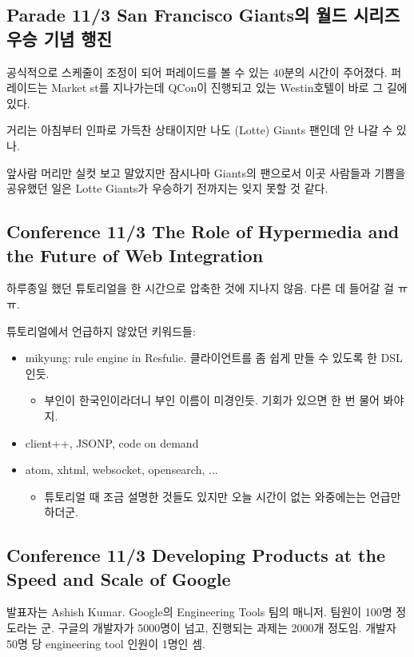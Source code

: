 \documentclass[a4paper]{article}
\begin{document}
\subsection{Parade 11/3 San Francisco Giants의 월드 시리즈 우승 기념 행진}
 
공식적으로 스케줄이 조정이 되어 퍼레이드를 볼 수 있는 40분의 시간이
주어졌다.  퍼레이드는 Market st를 지나가는데 QCon이 진행되고 있는
Westin호텔이 바로 그 길에 있다.
 
거리는 아침부터 인파로 가득찬 상태이지만 나도 (Lotte) Giants 팬인데 안
나갈 수 있나.
 
앞사람 머리만 실컷 보고 말았지만 잠시나마 Giants의 팬으로서 이곳
사람들과 기쁨을 공유했던 일은 Lotte Giants가 우승하기 전까지는 잊지
못할 것 같다.
 
\subsection{Conference 11/3 The Role of Hypermedia and the Future of
  Web Integration}
 
하루종일 했던 튜토리얼을 한 시간으로 압축한 것에 지나지 않음. 다른 데
들어갈 걸 ㅠㅠ.
 
튜토리얼에서 언급하지 않았던 키워드들:
\begin{itemize}
\item mikyung: rule engine in Resfulie. 클라이언트를 좀 쉽게 만들 수
  있도록 한 DSL인듯.
  \begin{itemize}
  \item 부인이 한국인이라더니 부인 이름이 미경인듯. 기회가 있으면 한 번
    물어 봐야지.
  \end{itemize}
\item client++, JSONP, code on demand
\item atom, xhtml, websocket, opensearch, ...
  \begin{itemize}
  \item 튜토리얼 때 조금 설명한 것들도 있지만 오늘 시간이 없는
    와중에는는 언급만 하더군.
  \end{itemize}
\end{itemize}
 
\subsection{Conference 11/3 Developing Products at the Speed and Scale
  of Google}
 
발표자는 Ashish Kumar. Google의 Engineering Tools 팀의 매니저. 팀원이
100명 정도라는 군.  구글의 개발자가 5000명이 넘고, 진행되는 과제는
2000개 정도임. 개발자 50명 당 engineering tool 인원이 1명인 셈.
 
\end{document}
